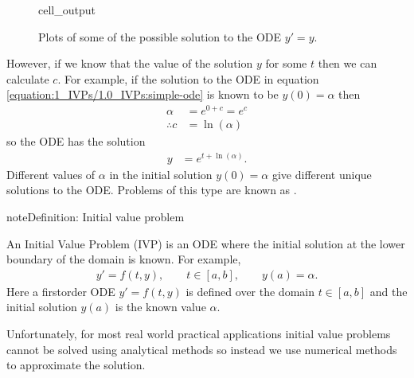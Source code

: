 \documentclass[letterpaper,10pt,english]{jupyterBook}
\begin{document}
\begin{figure}[htbp]
\centering
\capstart
\begin{sphinxVerbatimOutput}

\begin{sphinxuseclass}{cell_output}
\noindent{}

\end{sphinxuseclass}\end{sphinxVerbatimOutput}
\caption{Plots of some of the possible solution to the ODE \(y' = y\).}\label{\detokenize{1_IVPs/1.0_IVPs:ode-plot-figure}}\end{figure}

\sphinxAtStartPar
However, if we know that the value of the solution \(y\) for some \(t\) then we can calculate \(c\). For example, if the solution to the ODE in equation \eqref{equation:1_IVPs/1.0_IVPs:simple-ode} is known to be \(y(0) = \alpha\) then
\begin{align*}
    \alpha &= e^{0 + c} = e^c \\
    \therefore c &= \ln(\alpha)
\end{align*}
\sphinxAtStartPar
so the ODE has the solution
\begin{align*}
    y &= e^{t + \ln(\alpha)}.
\end{align*}
\sphinxAtStartPar
Different values of \(\alpha\) in the initial solution \(y(0)=\alpha\) give different unique solutions to the ODE. Problems of this type are known as .

\begin{sphinxadmonition}{note}{Definition: Initial value problem}

\sphinxAtStartPar
An Initial Value Problem (IVP) is an ODE where the initial solution at the lower boundary of the domain is known. For example,
\begin{align*}
    y' = f(t,y), \qquad t\in [a ,b ], \qquad y(a) = \alpha.
\end{align*}
\sphinxAtStartPar
Here a first\sphinxhyphen{}order ODE \(y'=f(t,y)\) is defined over the domain \(t\in [a ,b]\) and the initial solution \(y(a)\) is the known value \(\alpha\).
\end{sphinxadmonition}

\sphinxAtStartPar
Unfortunately, for most real world practical applications initial value problems cannot be solved using analytical methods so instead we use numerical methods to approximate the solution.

\sphinxstepscope
\end{document}
